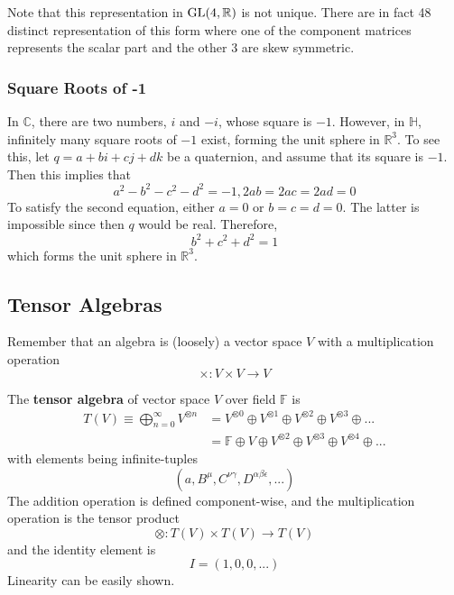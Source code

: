     Note that this representation in $\GL(4, \mathbb{R})$ is not unique. There are in fact 48 distinct representation of this form where one of the component matrices represents the scalar part and the other 3 are skew symmetric. 

  \subsubsection{Square Roots of -1}

    In $\mathbb{C}$, there are two numbers, $i$ and $-i$, whose square is $-1$. However, in $\mathbb{H}$, infinitely many square roots of $-1$ exist, forming the unit sphere in $\mathbb{R}^3$. To see this, let $q = a+bi+cj+dk$ be a quaternion, and assume that its square is $-1$. Then this implies that
    \begin{equation}
      a^2 - b^2 -c^2 -d^2 = -1, 2ab = 2ac = 2ad = 0
    \end{equation}
    To satisfy the second equation, either $a=0$ or $b=c=d=0$. The latter is impossible since then $q$ would be real. Therefore, 
    \begin{equation}
      b^2 + c^2 + d^2 = 1
    \end{equation}
    which forms the unit sphere in $\mathbb{R}^3$. 

\subsection{Tensor Algebras}

  Remember that an algebra is (loosely) a vector space $V$ with a multiplication operation
  \begin{equation}
    \times: V \times V \longrightarrow V
  \end{equation}

  \begin{definition}
    The \textbf{tensor algebra} of vector space $V$ over field $\mathbb{F}$ is 
    \begin{align*}
      T(V) \equiv \bigoplus_{n = 0}^{\infty} V^{\otimes n} & = V^{\otimes 0} \oplus V^{\otimes 1} \oplus V^{\otimes 2} \oplus V^{\otimes 3} \oplus ... \\
      & = \mathbb{F} \oplus V \oplus V^{\otimes 2} \oplus V^{\otimes 3} \oplus V^{\otimes 4} \oplus ...
    \end{align*}
    with elements being infinite-tuples
    \begin{equation}
      (a, B^\mu, C^{\nu \gamma}, D^{\alpha \beta \epsilon}, ...)
    \end{equation}
    The addition operation is defined component-wise, and the multiplication operation is the tensor product 
    \begin{equation}
      \otimes: T(V) \times T(V) \longrightarrow T(V)
    \end{equation}
    and the identity element is
    \begin{equation}
      I = (1, 0, 0, ...)
    \end{equation}
    Linearity can be easily shown. 
  \end{definition}

